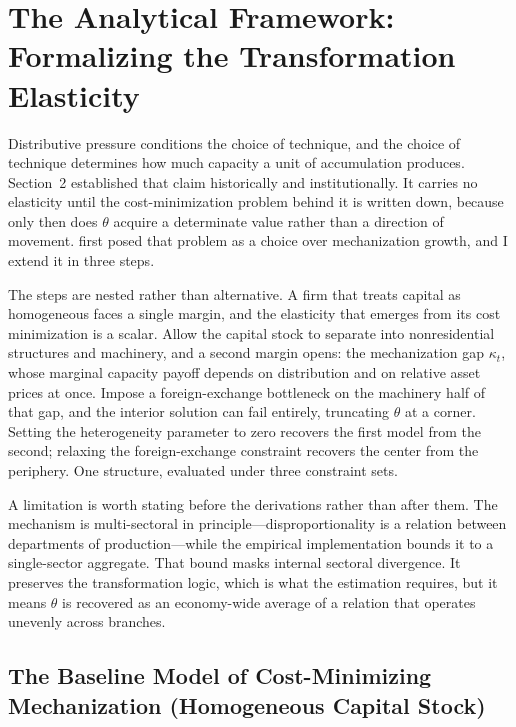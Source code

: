 \section{The Analytical Framework: Formalizing the
	Transformation Elasticity}
\label{sec:3:analytical_framework}

Distributive pressure conditions the choice of technique, and the choice
of technique determines how much capacity a unit of accumulation
produces. Section~2 established that claim historically and
institutionally. It carries no elasticity until the cost-minimization
problem behind it is written down, because only then does $\theta$ acquire
a determinate value rather than a direction of movement.
\citet{CajasGuajirro2024} first posed that problem as a choice over
mechanization growth, and I extend it in three steps.

The steps are nested rather than alternative. A firm that treats capital
as homogeneous faces a single margin, and the elasticity that emerges
from its cost minimization is a scalar. Allow the capital stock to
separate into nonresidential structures and machinery, and a second
margin opens: the mechanization gap $\kappa_t$, whose marginal capacity
payoff depends on distribution and on relative asset prices at once.
Impose a foreign-exchange bottleneck on the machinery half of that gap,
and the interior solution can fail entirely, truncating $\theta$ at a
corner. Setting the heterogeneity parameter to zero recovers the first
model from the second; relaxing the foreign-exchange constraint recovers
the center from the periphery. One structure, evaluated under three
constraint sets.

A limitation is worth stating before the derivations rather than after
them. The mechanism is multi-sectoral in principle---disproportionality
is a relation between departments of production---while the empirical
implementation bounds it to a single-sector aggregate. That bound masks
internal sectoral divergence. It preserves the transformation logic,
which is what the estimation requires, but it means $\theta$ is recovered
as an economy-wide average of a relation that operates unevenly across
branches.

\subsection{The Baseline Model of Cost-Minimizing
	Mechanization (Homogeneous Capital Stock)}

